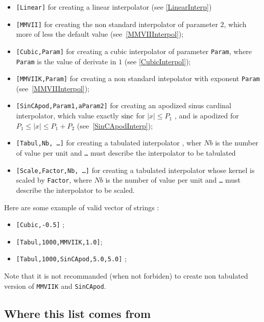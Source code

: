 \begin{itemize}
    \item {\tt [Linear]}  for creating a linear interpolator (see \ref{LinearInterp})
    \item {\tt [MMVII]}  for creating the non standard interpolator of parameter $2$, which more of less the default value 
                         (see~\ref{MMVIIInterpol});
    \item {\tt [Cubic,Param]} for creating a cubic interpolator of parameter {\tt Param}, where {\tt Param} is the value
          of derivate in $1$ (see  \ref{CubicInterpol});
    \item {\tt [MMVIIK,Param]} for creating a non standard intepolator with exponent {\tt Param} 
                         (see~\ref{MMVIIInterpol});
    \item {\tt [SinCApod,Param1,aParam2]}  for creating an apodized sinus cardinal interpolator, which value exactly
         $\operatorname{sinc}$ for    $ |x| \leq P_1$  , and is apodized for   $ P_1\leq |x| \leq P_1+P_2$
                         (see~\ref{SinCApodInterp});
    \item {\tt [Tabul,Nb, \dots ]} for creating a tabulated interpolator , wher  $Nb$ is the number of value per unit  
          and {\tt \dots} must describe the interpolator to be tabulated
    \item {\tt [Scale,Factor,Nb, \dots ]} for creating a tabulated interpolator whose kernel is scaled
          by {\tt Factor}, where $Nb$ is the number of value per unit and {\tt \dots} must describe the
          interpolator to be scaled.
\end{itemize}

Here are some example of valid vector of strings :

\begin{itemize}
    \item   {\tt [Cubic,-0.5]} ;
    \item   {\tt [Tabul,1000,MMVIIK,1.0]};
    \item   {\tt [Tabul,1000,SinCApod,5.0,5.0]} ;
\end{itemize}

Note that it is not recommanded (when not forbiden) to create non tabulated version of {\tt MMVIIK} and 
{\tt SinCApod}.


\subsection{Where this list comes from}
\label{InterpUserViewRegistry}

